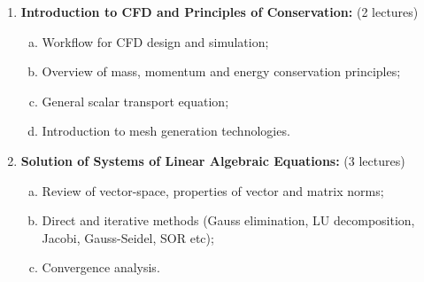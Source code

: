 \documentclass[12pts,a4paper,amsmath,amssymb,floatfix]{article}%
\begin{document}
\begin{enumerate}[{\bf Module 1}]
\item {\bf Introduction to CFD and Principles of Conservation:} (2 lectures)
   \begin{enumerate}[(a)]
      \item Workflow for CFD design and simulation;
      \item Overview of mass, momentum and energy conservation principles;
      \item General scalar transport equation;
      \item Introduction to mesh generation technologies.
   \end{enumerate}

\begin{comment}
\item {\bf Basic Programming Concepts:} (2 lectures)
  \begin{enumerate}[(a)]
       \item Source code, compilers and executables;
       \item Design and implementation of algorithms;
       \item Main programming structures: data types, operators, loops and conditionals;
       \item Arrays and arrays processing.
   \end{enumerate}
\end{comment}

\item {\bf Solution of Systems of Linear Algebraic Equations:} (3 lectures)
   \begin{enumerate}[(a)]
      \item Review of vector-space, properties of vector and matrix norms;
      \item Direct and iterative methods (Gauss elimination, LU decomposition, Jacobi, Gauss-Seidel, SOR etc);
      \item Convergence analysis.
   \end{enumerate}


\end{enumerate}
\end{document}
